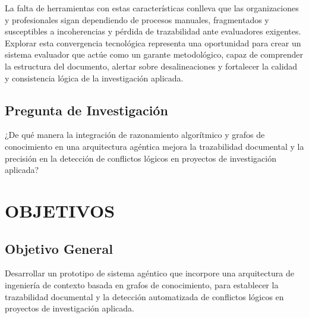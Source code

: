 \documentclass[12pt,letterpaper]{article}
\begin{document}
La falta de herramientas con estas características conlleva que las organizaciones y profesionales sigan dependiendo de procesos manuales, fragmentados y susceptibles a incoherencias y pérdida de trazabilidad ante evaluadores exigentes. Explorar esta convergencia tecnológica representa una oportunidad para crear un sistema evaluador que actúe como un garante metodológico, capaz de comprender la estructura del documento, alertar sobre desalineaciones y fortalecer la calidad y consistencia lógica de la investigación aplicada.

\subsection{Pregunta de Investigación}
\vspace{-0.5cm}
¿De qué manera la integración de razonamiento algorítmico y grafos de conocimiento en una arquitectura agéntica mejora la trazabilidad documental y la precisión en la detección de conflictos lógicos en proyectos de investigación aplicada?
\newpage
\section{OBJETIVOS}
\vspace{-0.5cm}

\subsection{Objetivo General}
\vspace{-0.5cm}
Desarrollar un prototipo de sistema agéntico que incorpore una arquitectura de ingeniería de contexto basada en grafos de conocimiento, para establecer la trazabilidad documental y la detección automatizada de conflictos lógicos en proyectos de investigación aplicada.
\end{document}
